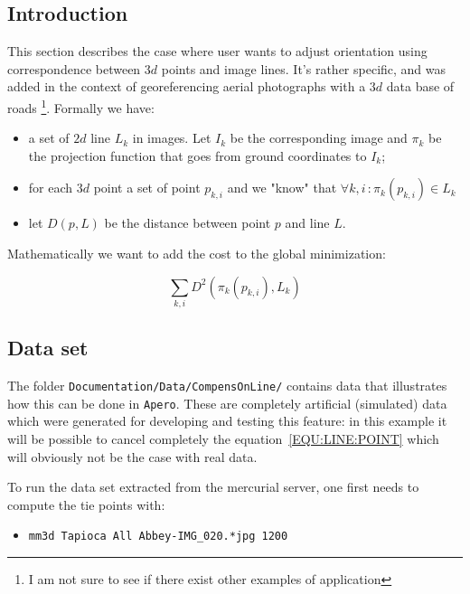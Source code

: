 \subsection{Introduction}

This section describes the case where user wants to adjust orientation using correspondence between $3d$ points
and image lines. It's rather specific, and was added in the context of georeferencing aerial photographs with a $3d$
data base of roads \footnote{I am not sure to see if there exist other examples of application}. Formally we have:

\begin{itemize}
    \item a set of $2d$ line $L_k$ in images. Let $I_k$ be the corresponding image and $\pi_k$ be the projection
         function that goes from ground coordinates to $I_k$;
    \item for each $3d$ point a set of point $p_{k,i}$ and we "know" that $\forall k,i \, : \pi_k (p_{k,i}) \in L_k $
    \item let $D(p,L)$ be the distance between point $p$ and line $L$.
\end{itemize}

Mathematically we want to add the cost to the global minimization:

\begin{equation}
    \sum_{k,i} D^2 ( \pi_k(p_{k,i}),L_k) \label{EQU:LINE:POINT}
\end{equation}



\subsection{Data set}

The folder {\tt Documentation/Data/CompensOnLine/} contains  data that illustrates how this can be done in
{\tt Apero}. These are completely artificial (simulated) data which were generated for developing and testing this feature: in this example it will be possible to cancel completely the equation~\ref{EQU:LINE:POINT} which will obviously not
be the case with real data.

To run the data set extracted from the mercurial server, one first needs to compute the tie points with:

\begin{itemize}
   \item {\tt mm3d Tapioca All Abbey-IMG\_020.*jpg 1200}
\end{itemize}

